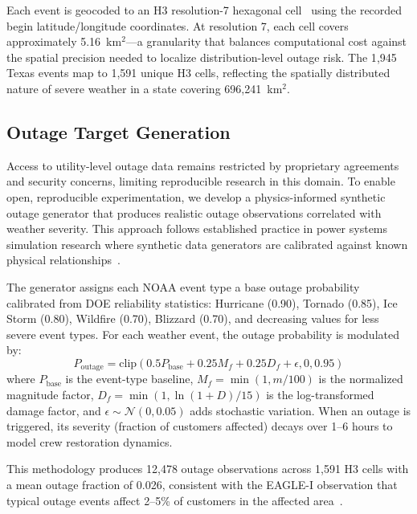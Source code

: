 \documentclass[conference]{IEEEtran}
\begin{document}
Each event is geocoded to an H3 resolution-7 hexagonal cell~\cite{uber_h3_2018} using the recorded begin latitude/longitude coordinates. At resolution 7, each cell covers approximately 5.16~km$^2$---a granularity that balances computational cost against the spatial precision needed to localize distribution-level outage risk. The 1{,}945 Texas events map to 1{,}591 unique H3 cells, reflecting the spatially distributed nature of severe weather in a state covering 696{,}241~km$^2$.

\subsection{Outage Target Generation}\label{sec:synthetic}

Access to utility-level outage data remains restricted by proprietary agreements and security concerns, limiting reproducible research in this domain. To enable open, reproducible experimentation, we develop a physics-informed synthetic outage generator that produces realistic outage observations correlated with weather severity. This approach follows established practice in power systems simulation research where synthetic data generators are calibrated against known physical relationships~\cite{panteli2015grid}.

The generator assigns each NOAA event type a base outage probability calibrated from DOE reliability statistics: Hurricane (0.90), Tornado (0.85), Ice Storm (0.80), Wildfire (0.70), Blizzard (0.70), and decreasing values for less severe event types. For each weather event, the outage probability is modulated by:
\begin{equation}\label{eq:outage_prob}
    P_{\text{outage}} = \text{clip}\!\left(0.5 P_{\text{base}} + 0.25 M_f + 0.25 D_f + \epsilon, 0, 0.95\right)
\end{equation}
where $P_{\text{base}}$ is the event-type baseline, $M_f = \min(1, m/100)$ is the normalized magnitude factor, $D_f = \min(1, \ln(1+D)/15)$ is the log-transformed damage factor, and $\epsilon \sim \mathcal{N}(0, 0.05)$ adds stochastic variation. When an outage is triggered, its severity (fraction of customers affected) decays over 1--6 hours to model crew restoration dynamics.

This methodology produces 12{,}478 outage observations across 1{,}591 H3 cells with a mean outage fraction of 0.026, consistent with the EAGLE-I observation that typical outage events affect 2--5\% of customers in the affected area~\cite{brelsford2024eaglei}.
\end{document}
